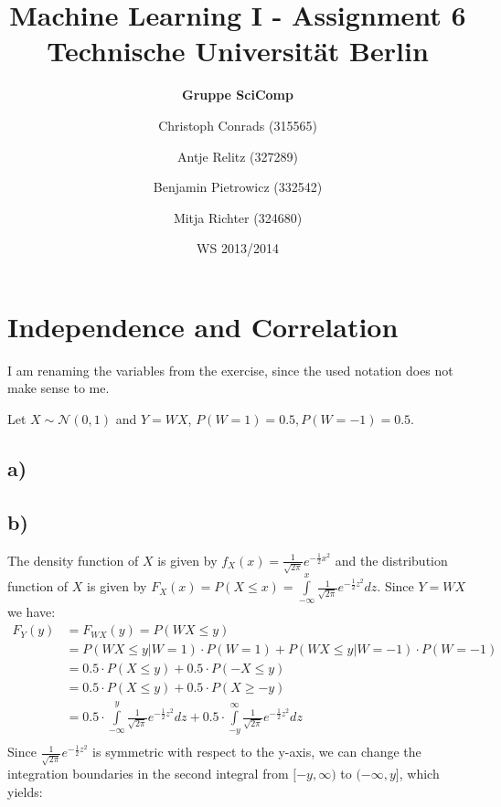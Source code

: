 \documentclass[paper=a4,fontsize=10pt,DIV11,BCOR10mm]{scrartcl}
\begin{document}
\title{Machine Learning I - Assignment 6\\
\small{Technische Universität Berlin}}


\author{\hspace{5cm}\textbf{Gruppe SciComp}\hspace{5cm} \and
	\small{Christoph Conrads (315565)} \and
	\small{Antje Relitz (327289)} \and
	\small{Benjamin Pietrowicz (332542)} \and
	\small{Mitja Richter (324680)}
}

\date{WS 2013/2014}

\maketitle


\section{Independence and Correlation}

I am renaming the variables from the exercise, since the used notation does not make sense to me.

Let $X\sim\mathcal{N}(0,1)$ and $Y=WX$, $P(W=1)=0.5, P(W=-1)=0.5$.

\subsection*{a)}



\subsection*{b)}
The density function of $X$ is given by $f_X(x)=\frac{1}{\sqrt{2 \pi}} e^{-\frac{1}{2}x^2}$ and the distribution function of $X$ is given by $F_X(x)=P(X\leq x)=\int\limits_{-\infty}^{x} \frac{1}{\sqrt{2 \pi}} e^{-\frac{1}{2}z^2}dz$.
Since $Y=WX$ we have:
\begin{align*}
F_Y(y)&=F_{WX}(y)=P(WX\leq y)\\
&= P(WX\leq y|W=1)\cdot P(W=1)+P(WX\leq y|W=-1)\cdot P(W=-1)\\
&= 0.5 \cdot P(X\leq y)+ 0.5 \cdot P(-X\leq y)\\
&= 0.5 \cdot P(X\leq y)+ 0.5 \cdot P(X \geq -y)\\
&= 0.5 \cdot \int\limits_{-\infty}^{y} \frac{1}{\sqrt{2 \pi}} e^{-\frac{1}{2}z^2}dz+ 0.5 \cdot \int\limits_{-y}^{\infty} \frac{1}{\sqrt{2 \pi}} e^{-\frac{1}{2}z^2}dz\\
\end{align*}
Since $\frac{1}{\sqrt{2 \pi}} e^{-\frac{1}{2}z^2}$ is symmetric with respect to the y-axis, we can change the integration boundaries in the second integral from $[-y,\infty)$ to $(-\infty,y]$, which yields:
\end{document}
